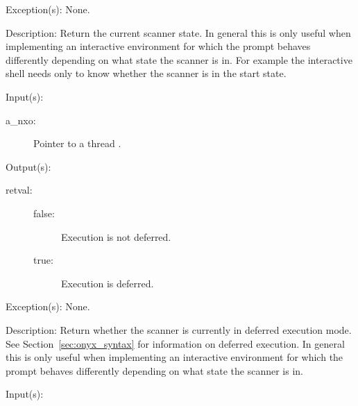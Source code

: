 \begin{capi}
\begin{capilist}
\begin{description}
\begin{description}
			\end{description}
		\end{description}
	\item[Exception(s): ] None.
	\item[Description: ]
		Return the current scanner state.  In general this is only
		useful when implementing an interactive environment for which
		the prompt behaves differently depending on what state the
		scanner is in.  For example the interactive  shell
		needs only to know whether the scanner is in the start state.
	\end{capilist}
\label{nxo_thread_deferred}
	\begin{capilist}
	\item[Input(s): ]
		\begin{description}\item[]
		\item[a\_nxo: ]
			Pointer to a thread .
		\end{description}
	\item[Output(s): ]
		\begin{description}\item[]
		\item[retval: ]
			\begin{description}\item[]
			\item[false: ]
				Execution is not deferred.
			\item[true: ]
				Execution is deferred.
			\end{description}
		\end{description}
	\item[Exception(s): ] None.
	\item[Description: ]
		Return whether the scanner is currently in deferred execution
		mode.  See Section~\ref{sec:onyx_syntax} for information on
		deferred execution.  In general this is only useful when
		implementing an interactive environment for which the prompt
		behaves differently depending on what state the scanner is in.
	\end{capilist}
\label{nxo_thread_reset}
	\begin{capilist}
	\item[Input(s): ]
		\begin{description}\item[]

\end{description}
\end{capilist}
\end{capi}
